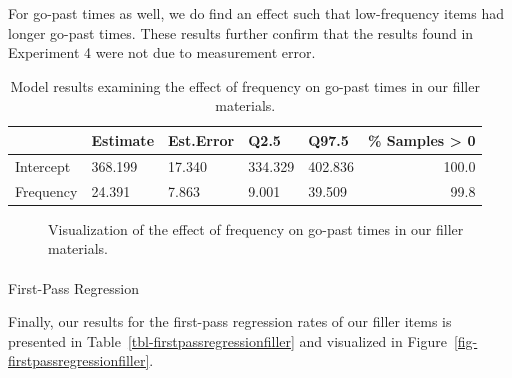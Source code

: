 \documentclass[
  12pt,
  letterpaper,
]{scrreprt}
\makeatletter
\let\oldparagraph\paragraph
\renewcommand{\paragraph}{
    \@ifstar
      \xxxParagraphStar
      \xxxParagraphNoStar
  }
\newcommand{\xxxParagraphStar}[1]{\oldparagraph*{#1}\mbox{}}
\newcommand{\xxxParagraphNoStar}[1]{\oldparagraph{#1}\mbox{}}
\makeatother
\begin{document}
For go-past times as well, we do find an effect such that low-frequency
items had longer go-past times. These results further confirm that the
results found in Experiment 4 were not due to measurement error.

\begin{longtable}[]{@{}lllllr@{}}

\caption{\label{tbl-gopastfiller}Model results examining the effect of
frequency on go-past times in our filler materials.}

\tabularnewline

\toprule\noalign{}
& Estimate & Est.Error & Q2.5 & Q97.5 & \% Samples \textgreater{} 0 \\
\midrule\noalign{}
\endhead
\bottomrule\noalign{}
\endlastfoot
Intercept & 368.199 & 17.340 & 334.329 & 402.836 & 100.0 \\
Frequency & 24.391 & 7.863 & 9.001 & 39.509 & 99.8 \\

\end{longtable}

\begin{figure}[htbp]

\caption{\label{fig-gopastfiller}Visualization of the effect of
frequency on go-past times in our filler materials.}


\end{figure}%

\paragraph{First-Pass Regression}\label{first-pass-regression-2}

Finally, our results for the first-pass regression rates of our filler
items is presented in Table~\ref{tbl-firstpassregressionfiller} and
visualized in Figure~\ref{fig-firstpassregressionfiller}.
\end{document}
